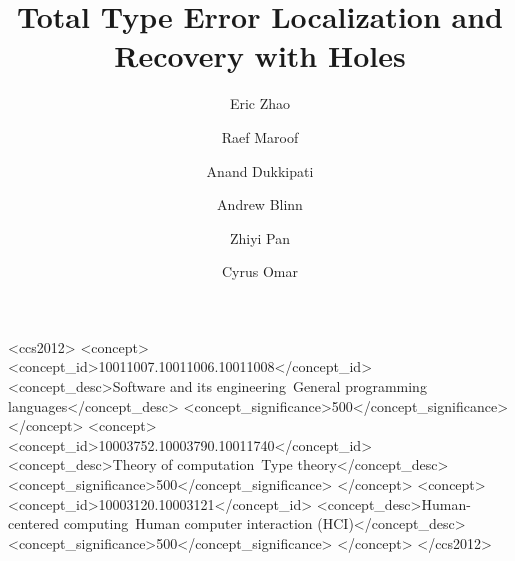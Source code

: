 \documentclass[acmsmall,screen,nonacm,prologue,dvipsnames]{acmart}
\begin{document}
\title{Total Type Error Localization and Recovery with Holes}

\author{Eric Zhao}

\author{Raef Maroof}

\author{Anand Dukkipati}

\author{Andrew Blinn}

\author{Zhiyi Pan}

\author{Cyrus Omar}



\begin{CCSXML}
<ccs2012>
   <concept>
       <concept_id>10011007.10011006.10011008</concept_id>
       <concept_desc>Software and its engineering~General programming languages</concept_desc>
       <concept_significance>500</concept_significance>
       </concept>
   <concept>
       <concept_id>10003752.10003790.10011740</concept_id>
       <concept_desc>Theory of computation~Type theory</concept_desc>
       <concept_significance>500</concept_significance>
       </concept>
   <concept>
       <concept_id>10003120.10003121</concept_id>
       <concept_desc>Human-centered computing~Human computer interaction (HCI)</concept_desc>
       <concept_significance>500</concept_significance>
       </concept>
 </ccs2012>
\end{CCSXML}



\maketitle









\end{document}
